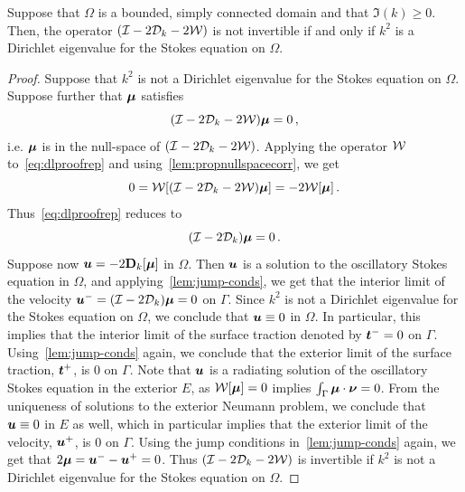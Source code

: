 \begin{theorem}
\label{thm:dlmain}
Suppose that $\Omega$ is a bounded, simply connected domain
{\color{red} and that $\Im (k) \geq 0$}. Then, the operator
$(\mathcal I - 2{\mathcal D}_{k} - 2 {\mathcal W})$ is not invertible if and only if $k^2$ is a
Dirichlet eigenvalue for the Stokes equation on $\Omega$.
\end{theorem}
\begin{proof}
  Suppose that $k^2$ is not a Dirichlet eigenvalue for
  the Stokes equation on
$\Omega$. 
Suppose further that ${\boldsymbol \mu}$ satisfies
\begin{equation}
(\mathcal I - 2{\mathcal D}_{k} - 2{\mathcal W}) {\boldsymbol \mu} = 0 \, , \label{eq:dlproofrep}
\end{equation}
i.e. ${\boldsymbol \mu}$ is in the null-space
of $(\mathcal I - 2 {\mathcal D}_{k} - 2 {\mathcal W})$. 
Applying the operator ${\mathcal W}$ to~\cref{eq:dlproofrep} and 
using~\cref{lem:propnullspacecorr}, we get
\begin{equation}
0 = {\mathcal W} [(\mathcal I - 2{\mathcal D}_{k} - 2{\mathcal W}){\boldsymbol \mu}] = -2{\mathcal W} [{\boldsymbol \mu}] \, .
\end{equation}
Thus~\cref{eq:dlproofrep} reduces to
\begin{equation}
(\mathcal I - 2 {\mathcal D}_{k}){\boldsymbol \mu} = 0\, .
\end{equation}
Suppose now ${\boldsymbol u} = -2{\bf D}_{k}[{\boldsymbol \mu}]$ in $\Omega$.
Then ${\boldsymbol u}$ is a solution to the oscillatory Stokes equation in $\Omega$,
and applying~\cref{lem:jump-conds}, we get that the interior
limit of the velocity ${\boldsymbol u}^{-}=(\mathcal I - 2{\mathcal D}_{k}) {\boldsymbol \mu} = 0$
on $\Gamma$. Since $k^2$ is not a Dirichlet eigenvalue for the Stokes
equation on $\Omega$, we conclude that ${\boldsymbol u} \equiv 0$ in $\Omega$. 
In particular, this implies that the interior limit of the surface traction
denoted by ${\boldsymbol t}^{-} = 0$ on $\Gamma$. 
Using~\cref{lem:jump-conds} again, we conclude that the exterior limit
of the surface traction, ${\boldsymbol t}^{+}$, is $0$ on $\Gamma$. 
Note that ${\boldsymbol u}$ is a radiating solution of the oscillatory
Stokes equation in the exterior $E$, as ${\mathcal W}[{\boldsymbol \mu}] = 0$ implies
$\int_{\Gamma} {\boldsymbol \mu} \cdot {\boldsymbol \nu} = 0$.
From the uniqueness of solutions to the exterior Neumann problem, 
we conclude that ${\boldsymbol u} \equiv 0$ in $E$ as well,
which in particular implies that
the exterior limit of the velocity, ${\boldsymbol u}^{+}$, is $0$ on $\Gamma$.   
Using the jump conditions in~\cref{lem:jump-conds} again, we
get that $2{\boldsymbol \mu} = {\boldsymbol u}^{-} - {\boldsymbol u}^{+} = 0$.
Thus $(\mathcal I - 2{\mathcal D}_{k} - 2{\mathcal W})$ is invertible if $k^2$
is not a Dirichlet eigenvalue for the Stokes equation on $\Omega$.


\end{proof}
